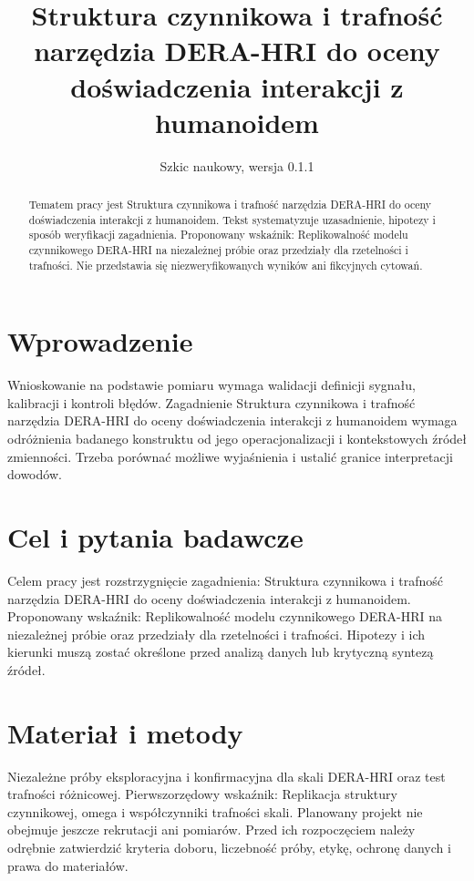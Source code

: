 \documentclass[11pt,a4paper]{article}
\title{Struktura czynnikowa i trafność narzędzia DERA-HRI do oceny doświadczenia interakcji z humanoidem}
\author{}
\date{Szkic naukowy, wersja 0.1.1}
\begin{document}
\maketitle

\begin{abstract}

Tematem pracy jest Struktura czynnikowa i trafność narzędzia DERA-HRI do oceny doświadczenia interakcji z humanoidem. Tekst systematyzuje uzasadnienie, hipotezy i sposób weryfikacji zagadnienia. Proponowany wskaźnik: Replikowalność modelu czynnikowego DERA-HRI na niezależnej próbie oraz przedziały dla rzetelności i trafności. Nie przedstawia się niezweryfikowanych wyników ani fikcyjnych cytowań.

\end{abstract}

\section{Wprowadzenie}

Wnioskowanie na podstawie pomiaru wymaga walidacji definicji sygnału, kalibracji i kontroli błędów. Zagadnienie Struktura czynnikowa i trafność narzędzia DERA-HRI do oceny doświadczenia interakcji z humanoidem wymaga odróżnienia badanego konstruktu od jego operacjonalizacji i kontekstowych źródeł zmienności. Trzeba porównać możliwe wyjaśnienia i ustalić granice interpretacji dowodów.

\section{Cel i pytania badawcze}

Celem pracy jest rozstrzygnięcie zagadnienia: Struktura czynnikowa i trafność narzędzia DERA-HRI do oceny doświadczenia interakcji z humanoidem. Proponowany wskaźnik: Replikowalność modelu czynnikowego DERA-HRI na niezależnej próbie oraz przedziały dla rzetelności i trafności. Hipotezy i ich kierunki muszą zostać określone przed analizą danych lub krytyczną syntezą źródeł.

\section{Materiał i metody}

Niezależne próby eksploracyjna i konfirmacyjna dla skali DERA-HRI oraz test trafności różnicowej. Pierwszorzędowy wskaźnik: Replikacja struktury czynnikowej, omega i współczynniki trafności skali. Planowany projekt nie obejmuje jeszcze rekrutacji ani pomiarów. Przed ich rozpoczęciem należy odrębnie zatwierdzić kryteria doboru, liczebność próby, etykę, ochronę danych i prawa do materiałów.
\end{document}

